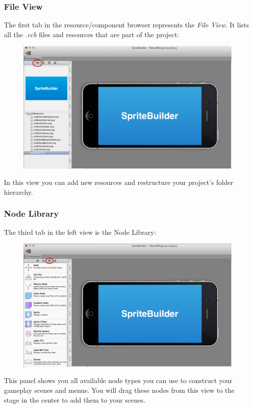 \subsubsection{File View}
The first tab in the resource/component browser represents the \textit{File
View}.
It lists all the \textit{.ccb} files and resources that are part of the \SB{}
project:
\begin{figure}[H]
		\centering
		\includegraphics[width=0.9\linewidth]{images/spritebuilder/spritebuilder_fileview.png}     
\end{figure} 
In this view you can add new resources and restructure your project's folder
hierarchy.
\subsubsection{Node Library}
The third tab in the left view is the {Node Library}:
\begin{figure}[H]
		\centering
		\includegraphics[width=0.9\linewidth]{images/spritebuilder/spritebuilder_nodeview.png}     
\end{figure} 
This panel shows you all available node types you can use to construct your
gameplay scenes and menus. You will drag these nodes from this view to the stage
in the center to add them to your scenes.

